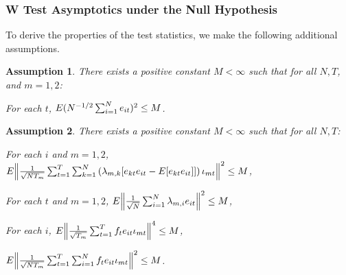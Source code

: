 \documentclass[12pt]{article}
\newtheorem{assump}{Assumption}
\newcommand*{\tran}{\intercal}
\theoremstyle{plain}
\numberwithin{equation}{section}
\begin{document}
\subsubsection{W Test Asymptotics under the Null Hypothesis}
To derive the properties of the test statistics, we make the following additional assumptions. 
\begin{assump}
\label{ass:14:W_test_error_assump}
There exists a positive constant $M \lt \infty$ such that for all $N, T$, and  $m = 1, 2$:
\begin{assumpenum}
\item \label{ass:14:W_test_error_assump:1}
For each $t$, $E(N^{-1/2} \sum_{i = 1}^{N} e_{it})^2 \leq M$.
\end{assumpenum}
\end{assump}
\begin{assump}
\label{ass:15}
There exists a positive constant $M < \infty$ such that for all $N, T$:
\begin{assumpenum}
\item \label{ass:15:1}
For each $i$ and $m = 1, 2$,
$E\norm{
\frac{1}{\sqrt{N T_m}} \sum_{t = 1}^{T} \sum_{k = 1}^{N} \left( \lambda_{m, k}
[e_{kt}e_{it} - E[e_{kt}e_{it}]] \right) \iota_{mt}
}^2 \leq M$,
\item \label{ass:15:2}
For each $t$ and $m = 1, 2$, $E \norm{\frac{1}{\sqrt{N}} \sum_{i = 1}^{N} \lambda_{m, i} e_{it} }^2 \leq M$,
\item \label{ass:15:3}
For each $i$, $E \norm{\frac{1}{\sqrt{T_m}} \sum_{t = 1}^{T} f_t e_{it} \iota_{mt}}^4 \leq M$,
\item \label{ass:15:4} 
$E \norm{
\frac{1}{\sqrt{N T_m}} \sum_{t = 1}^{T} \sum_{i = 1}^{N} f_t e_{it} \iota_{mt}
}^2 \leq M$.
\end{assumpenum}
\end{assump}
\end{document}
